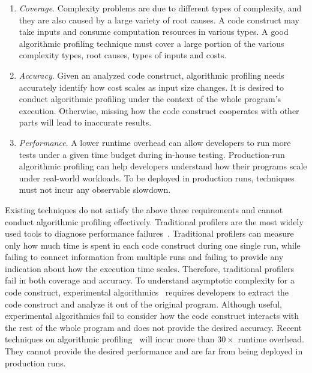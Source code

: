 \begin{enumerate}

\item \textit{Coverage}. Complexity problems are due to different types of complexity, 
and they are also caused by a large variety of root causes. 
A code construct may take inputs and 
consume computation resources in various types.
A good algorithmic profiling technique must cover a 
large portion of the various complexity types, root causes, types of inputs and costs.


\item \textit{Accuracy}. 
Given an analyzed code construct,
algorithmic profiling needs accurately identify 
how cost scales as input size changes.
It is desired to conduct algorithmic profiling under the context of the whole program's execution. 
Otherwise, missing how the code construct cooperates with other parts will lead to inaccurate results. 

\item \textit{Performance}. 
A lower runtime overhead can allow developers to run more tests 
under a given time budget during in-house testing.
Production-run algorithmic profiling can help developers 
understand how their programs scale
under real-world workloads.
To be deployed in production runs, 
techniques must not incur any observable slowdown.


\end{enumerate}

Existing techniques do not satisfy the above three requirements and 
cannot conduct algorithmic profiling effectively. 
Traditional profilers are the most widely used tools to 
diagnose performance failures~\cite{gprof,oprofile}. 
Traditional profilers can measure only how much time is spent in each code construct during one single run, 
while failing to connect information from multiple runs 
and failing to provide any indication about how the execution time scales.
Therefore, traditional profilers fail in both coverage and accuracy.  
To understand asymptotic complexity for a code construct,
experimental algorithmics~\cite{expalg1,expalg2,expalg3} requires developers to 
extract the code construct and analyze it out of the original program. 
Although useful,
experimental algorithmics fail to consider how the code 
construct interacts with the rest of the whole program and does not provide the desired accuracy. 
Recent techniques on algorithmic profiling~\cite{Aprof1,Aprof2,AlgoProf} will incur more than $30\times$ runtime overhead.
They cannot provide the desired performance and are far from being deployed in production runs. 



